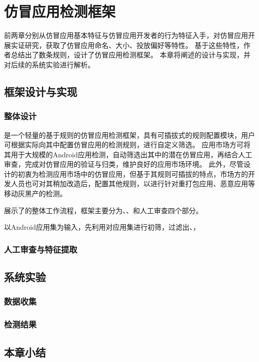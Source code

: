 \chapter{仿冒应用检测框架\mytool}
\label{chp:framework_prototype}

前两章分别从仿冒应用基本特征与仿冒应用开发者的行为特征入手，对仿冒应用开展实证研究，获取了仿冒应用命名、大小、投放偏好等特性。
基于这些特性，作者总结出了数条规则，设计了仿冒应用检测框架\mytool 。
本章将阐述\mytool 的设计与实现，并对后续的系统实验进行解析。

\section{框架设计与实现}

\subsection{整体设计}
\mytool 是一个轻量的基于规则的仿冒应用检测框架，具有可插拔式的规则配置模块，用户可根据实际向其中配置仿冒应用的检测规则，进行自定义筛选。
应用市场方可将其用于大规模的Android应用检测，自动筛选出其中的潜在仿冒应用，再结合人工审查，完成对仿冒应用的验证与归类，维护良好的应用市场环境。
此外，尽管\mytool 设计的初衷为检测应用市场中的仿冒应用，但基于其规则可插拔的特点，市场方的开发人员也可对其稍加改造后，配置其他规则，以进行针对重打包应用、恶意应用等移动灰黑产的检测。


展示了\mytool 的整体工作流程，框架主要分为\componentA 、\componentB 、\componentC 和人工审查四个部分。

\mytool 以Android应用集为输入，先利用\componentA 对应用集进行初筛，过滤出、，

\subsection{\componentA }
\subsection{\componentB }
\subsection{\componentC }
\subsection{人工审查与特征提取}
\section{系统实验}
\subsection{数据收集}
\subsection{检测结果}
\section{本章小结}
